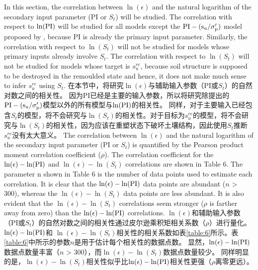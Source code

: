 \begin{Parallel}{0.60\textwidth}{}
{    }
    \ParallelPar
    
    \ParallelLText
    {
        In this section, the correlation between $\ln(\epsilon)$ and the natural logarithm of the secondary input parameter (PI or $S_t$) will be  studied. The correlation with respect to $\ln(\rm{PI})$ will be studied for all models except the $\rm{PI}-(s_u/\sigma_p')$ model proposed by \citet{Mesri1975409, Mesri1989162}, because PI is already the primary input parameter. Similarly, the correlation with respect to $\ln(S_t)$ will not be studied for models whose primary inputs already involve $S_t$. The correlation with respect to $\ln(S_t)$ will not be studied for models whose target is $s_u^{re}$, because soil structure is supposed to be destroyed in the  remoulded state and hence, it does not make much sense to infer $s_u^{re}$ using $S_t$.
    }
    \ParallelRText
    {
        在本节中，将研究$\ln(\epsilon)$与辅助输入参数（PI或$S_t$）的自然对数之间的相关性。 因为PI已经是主要的输入参数，所以将研究除\citet{Mesri1975409, Mesri1989162}提出的$\rm{PI}-(s_u/\sigma_p')$模型以外的所有模型与$\ln(\rm{PI})$的相关性。 同样，对于主要输入已经包含$S_t$的模型，将不会研究与$\ln(S_t)$的相关性。对于目标为$s_u^{re}$的模型，将不会研究与$\ln(S_t)$的相关性，因为应该在重塑状态下破坏土壤结构，因此使用$S_t$推断$s_u^{re}$没有太大意义。
    }
    \ParallelPar
    \ParallelLText
    {
        The correlation between $\ln(\epsilon)$ and the natural logarithm of the secondary input parameter (PI or $S_t$) is quantified by the Pearson product moment correlation coefficient ($\rho$). The correlation coefficient for the $\ln(\epsilon)-\ln(\rm{PI})$ and $\ln(\epsilon)-\ln(S_t)$ correlations are shown in Table 6. The parameter n shown in Table 6 is the number of data points used to estimate each correlation. It is clear that the $\ln(\epsilon)-\ln(\rm{PI})$ data points are abundant ($n$ > 300), whereas the $\ln(\epsilon)-\ln(S_t)$ data points are less abundant. It is also evident that the $\ln(\epsilon)-\ln(S_t)$ correlations seem stronger ($\rho$ is farther away from zero) than the $\ln(\epsilon)-\ln(\rm{PI})$ correlations.
    }
    \ParallelRText
    {
        $\ln(\epsilon)$和辅助输入参数（PI或$S_t$）的自然对数之间的相关性通过皮尔逊乘积矩相关系数（$\rho$）进行量化。 $\ln(\epsilon)-\ln(\rm{PI})$和 $\ln(\epsilon)-\ln(S_t)$相关性的相关系数如表\ref{table:6}所示。表\ref{table:6}中所示的参数$n$是用于估计每个相关性的数据点数。 显然，$\ln(\epsilon)-\ln(\rm{PI})$数据点数量丰富（$n$ > 300），而$\ln(\epsilon)-\ln(S_t)$数据点数量较少。 同样明显的是，$\ln(\epsilon)-\ln(S_t)$相关性似乎比$\ln(\epsilon)-\ln(\rm{PI})$相关性更强（$\rho$离零更远）。
    }
    \ParallelPar
    
\end{Parallel}

